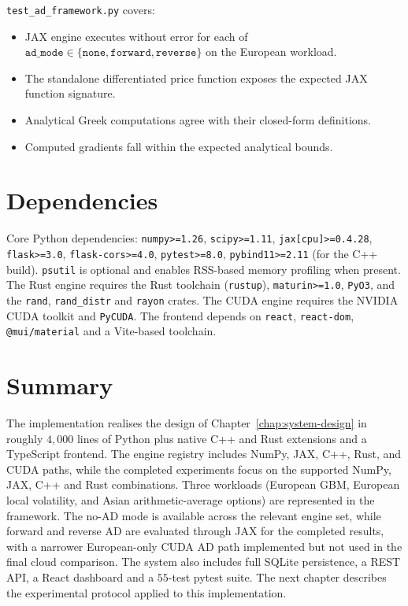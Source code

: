 \texttt{test\_ad\_framework.py} covers:

\begin{itemize}
    \item JAX engine executes without error for each of
          \(\texttt{ad\_mode} \in \{\texttt{none}, \texttt{forward}, \texttt{reverse}\}\)
          on the European
          workload.
    \item The standalone differentiated price function exposes the expected
          JAX function signature.
    \item Analytical Greek computations agree with their closed-form
          definitions.
    \item Computed gradients fall within the expected analytical bounds.
\end{itemize}

\section{Dependencies}
\label{sec:impl-deps}

Core Python dependencies: \texttt{numpy>=1.26}, \texttt{scipy>=1.11},
\texttt{jax[cpu]>=0.4.28}, \texttt{flask>=3.0}, \texttt{flask-cors>=4.0},
\texttt{pytest>=8.0}, \texttt{pybind11>=2.11} (for the C++ build). \texttt{psutil}
is optional and enables RSS-based memory profiling when present. The Rust
engine requires the Rust toolchain (\texttt{rustup}), \texttt{maturin>=1.0},
\texttt{PyO3}, and the \texttt{rand}, \texttt{rand\_distr} and \texttt{rayon}
crates. The CUDA engine requires the NVIDIA CUDA toolkit and \texttt{PyCUDA}.
The frontend depends on \texttt{react}, \texttt{react-dom}, \texttt{@mui/material}
and a Vite-based toolchain.

\section{Summary}
\label{sec:impl-summary}

The implementation realises the design of Chapter~\ref{chap:system-design} in
roughly $4{,}000$ lines of Python plus native C++ and Rust extensions and a
TypeScript frontend. The engine registry includes NumPy, JAX, C++, Rust, and
CUDA paths, while the completed experiments focus on the supported NumPy, JAX,
C++ and Rust combinations. Three workloads (European GBM, European local
volatility, and Asian arithmetic-average options) are represented in the
framework. The no-AD mode is available across the relevant engine set, while
forward and reverse AD are evaluated through JAX for the completed results,
with a narrower European-only CUDA AD path implemented but not used in the
final cloud comparison. The system also includes full SQLite persistence, a
REST API, a React dashboard and a $55$-test pytest suite. The next chapter
describes the experimental protocol applied to this implementation.
